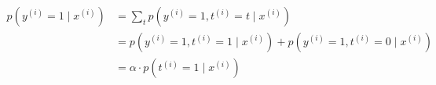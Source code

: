 \begin{answer}
\begin{align*}
    p(y^{(i)}=1\mid x^{(i)}) &= \sum_t p(y^{(i)}=1, t^{(i)}=t\mid x^{(i)}) \\
    &= p(y^{(i)}=1, t^{(i)}=1\mid x^{(i)}) + p(y^{(i)}=1, t^{(i)}=0\mid x^{(i)}) \\
    &= \alpha \cdot p(t^{(i)}=1\mid x^{(i)})\\
\end{align*}
\end{answer}
